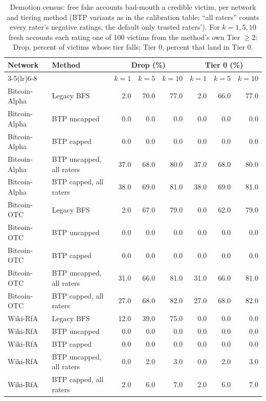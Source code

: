 \begin{table}[!t]
\centering
\scriptsize
\setlength{\tabcolsep}{3pt}
\caption{Demotion census: free fake accounts bad-mouth a credible victim, per network and tiering method (BTP variants as in the calibration table; ``all raters'' counts every rater's negative ratings, the default only trusted raters'). For $k = 1, 5, 10$ fresh accounts each rating one of 100 victims from the method's own Tier $\ge 2$: Drop, percent of victims whose tier falls; Tier 0, percent that land in Tier 0.}
\label{tab:s_s_credibility_demotion}
\begin{tabular}{@{}llrrrrrr@{}}
\toprule
\textbf{Network} & \textbf{Method} & \multicolumn{3}{c}{\textbf{Drop (\%)}} & \multicolumn{3}{c}{\textbf{Tier 0 (\%)}} \\
\cmidrule(lr){3-5}\cmidrule(lr){6-8}
 & & $k{=}1$ & $k{=}5$ & $k{=}10$ & $k{=}1$ & $k{=}5$ & $k{=}10$ \\
\midrule
Bitcoin-Alpha & Legacy BFS & 2.0 & 70.0 & 77.0 & 2.0 & 66.0 & 77.0 \\
Bitcoin-Alpha & BTP uncapped & 0.0 & 0.0 & 0.0 & 0.0 & 0.0 & 0.0 \\
Bitcoin-Alpha & BTP capped & 0.0 & 0.0 & 0.0 & 0.0 & 0.0 & 0.0 \\
Bitcoin-Alpha & BTP uncapped, all raters & 37.0 & 68.0 & 80.0 & 37.0 & 68.0 & 80.0 \\
Bitcoin-Alpha & BTP capped, all raters & 38.0 & 69.0 & 81.0 & 38.0 & 69.0 & 81.0 \\
Bitcoin-OTC & Legacy BFS & 2.0 & 67.0 & 79.0 & 0.0 & 62.0 & 79.0 \\
Bitcoin-OTC & BTP uncapped & 0.0 & 0.0 & 0.0 & 0.0 & 0.0 & 0.0 \\
Bitcoin-OTC & BTP capped & 0.0 & 0.0 & 0.0 & 0.0 & 0.0 & 0.0 \\
Bitcoin-OTC & BTP uncapped, all raters & 31.0 & 66.0 & 81.0 & 31.0 & 66.0 & 81.0 \\
Bitcoin-OTC & BTP capped, all raters & 27.0 & 68.0 & 82.0 & 27.0 & 68.0 & 82.0 \\
Wiki-RfA & Legacy BFS & 12.0 & 39.0 & 75.0 & 0.0 & 0.0 & 0.0 \\
Wiki-RfA & BTP uncapped & 0.0 & 0.0 & 0.0 & 0.0 & 0.0 & 0.0 \\
Wiki-RfA & BTP capped & 0.0 & 0.0 & 0.0 & 0.0 & 0.0 & 0.0 \\
Wiki-RfA & BTP uncapped, all raters & 0.0 & 2.0 & 3.0 & 0.0 & 2.0 & 3.0 \\
Wiki-RfA & BTP capped, all raters & 2.0 & 6.0 & 7.0 & 2.0 & 6.0 & 7.0 \\
\bottomrule
\end{tabular}
\end{table}
